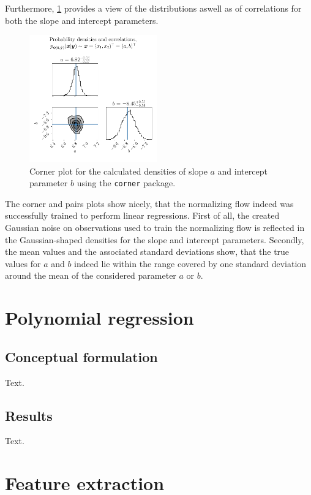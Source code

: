 \documentclass[a4paper,12pt]{report}
\begin{document}
Furthermore, \cref{fig:nf-linear-regression-example-pairs-corner} provides a view of the distributions aswell as of correlations for both the slope and intercept parameters.
\begin{figure}[h]
\centering
\includegraphics[width=0.49\textwidth]{figures/nf-linear-regression-example-corner}
\cprotect\caption{Corner plot for the calculated densities of slope $a$ and intercept parameter $b$ using the \verb|corner| package.}
\label{fig:nf-linear-regression-example-pairs-corner}
\end{figure}
The corner and pairs plots show nicely, that the normalizing flow indeed was successfully trained to perform linear regressions. First of all, the created Gaussian noise on observations used to train the normalizing flow is reflected in the Gaussian-shaped densities for the slope and intercept parameters. Secondly, the mean values and the associated standard deviations show, that the true values for $a$ and $b$ indeed lie within the range covered by one standard deviation around the mean of the considered parameter $a$ or $b$.


\section{Polynomial regression}
\subsection{Conceptual formulation}
Text.

\subsection{Results}
Text.

\FloatBarrier
\section{Feature extraction}
\end{document}
